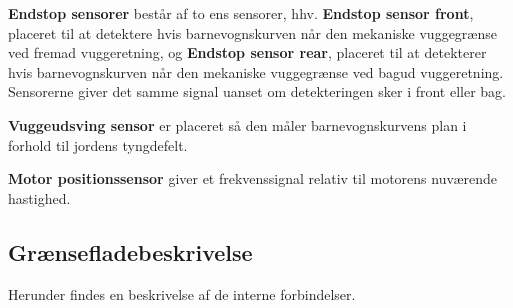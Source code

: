 
\vspace{5mm} 

\textbf{Endstop sensorer} består af to ens sensorer, hhv. \textbf{Endstop sensor front}, placeret til at detektere hvis barnevognskurven når den mekaniske vuggegrænse ved fremad vuggeretning, og \textbf{Endstop sensor rear}, placeret til at detekterer hvis barnevognskurven når den mekaniske vuggegrænse ved bagud vuggeretning. Sensorerne giver det samme signal uanset om detekteringen sker i front eller bag.

\vspace{5mm}

\textbf{Vuggeudsving sensor} er placeret så den måler barnevognskurvens plan i forhold til jordens tyngdefelt. 

\vspace{5mm}

\textbf{Motor positionssensor} giver et frekvenssignal relativ til motorens nuværende hastighed. 

\newpage
\subsection{Grænsefladebeskrivelse}
Herunder findes en beskrivelse af de interne forbindelser. 

